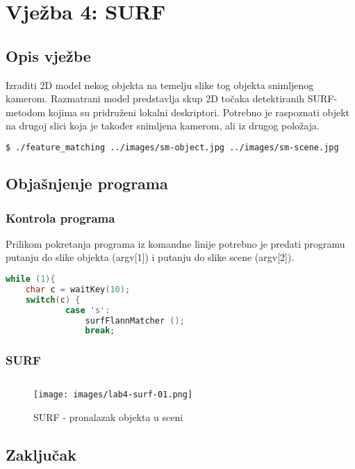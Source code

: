\section{Vježba 4: SURF}

\subsection{Opis vježbe}
Izraditi 2D model nekog objekta na temelju slike tog objekta snimljenog
kamerom. Razmatrani model predstavlja skup 2D točaka detektiranih
SURF-metodom kojima su pridruženi lokalni deskriptori.  Potrebno je
raspoznati objekt na drugoj slici koja je također snimljena kamerom, ali
iz drugog položaja.  
\\
\begin{lstlisting}[language=bash,caption={Pokretanje programa iz
    komandne linije}]
$ ./feature_matching ../images/sm-object.jpg ../images/sm-scene.jpg 
\end{lstlisting}

\subsection{Objašnjenje programa}

\subsubsection{Kontrola programa}

Prilikom pokretanja programa iz komandne linije potrebno je 
predati programu putanju do slike objekta (argv[1]) i putanju do slike
scene (argv[2]). 
\\

\begin{lstlisting}[language=C,caption={Kontrola programa tipkovnicom}]
while (1){
    char c = waitKey(10);
    switch(c) {
            case 's':
                surfFlannMatcher ();
                break;
\end{lstlisting}


\subsubsection{SURF}

\begin{lstlisting}[language=C,caption={Racunanje parametra ro i theta}]
\end{lstlisting}

\begin{figure}[h]
\centering
\texttt{[image: images/lab4-surf-01.png]}
\caption{SURF - pronalazak objekta u sceni}
\label{fig:lab4-surf-01}
\end{figure}

\newpage
\subsection{Zaključak}
